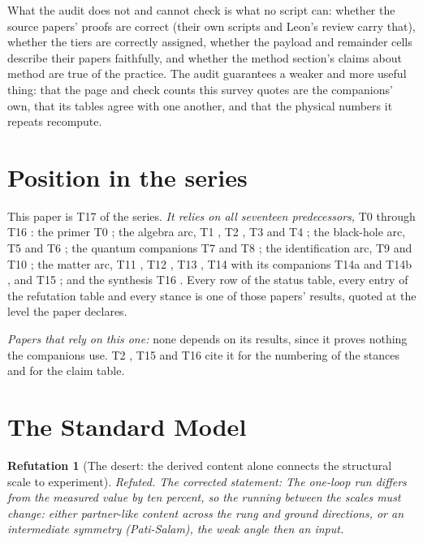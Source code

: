 \documentclass[11pt]{article}
\newtheorem{refutation}[theorem]{Refutation}
\theoremstyle{definition}
\theoremstyle{plain}
\begin{document}
What the audit does not and cannot check is what no script can: whether the source papers' proofs are correct (their own scripts and Leon's review carry that), whether the tiers are correctly assigned, whether the payload and remainder cells describe their papers faithfully, and whether the method section's claims about method are true of the practice. The audit guarantees a weaker and more useful thing: that the page and check counts this survey quotes are the companions' own, that its tables agree with one another, and that the physical numbers it repeats recompute.

\section{Position in the series}

\label{c:note.programme.setting-position-series}
This paper is T17 of the series. \emph{It relies on all seventeen predecessors,} T0 \cite{ButlerT0} through T16 \cite{ButlerT16}: the primer T0 \cite{ButlerT0}; the algebra arc, T1 \cite{ButlerT1}, T2 \cite{ButlerT2}, T3 \cite{ButlerT3} and T4 \cite{ButlerT4}; the black-hole arc, T5 \cite{ButlerT5} and T6 \cite{ButlerT6}; the quantum companions T7 \cite{ButlerT7} and T8 \cite{ButlerT8}; the identification arc, T9 \cite{ButlerT9} and T10 \cite{ButlerT10}; the matter arc, T11 \cite{ButlerT11}, T12 \cite{ButlerT12}, T13 \cite{ButlerT13}, T14 \cite{ButlerT14} with its companions T14a \cite{ButlerT14a} and T14b \cite{ButlerT14b}, and T15 \cite{ButlerT15}; and the synthesis T16 \cite{ButlerT16}. Every row of the status table, every entry of the refutation table and every stance is one of those papers' results, quoted at the level the paper declares.

\emph{Papers that rely on this one:} none depends on its results, since it proves nothing the companions use. T2 \cite{ButlerT2}, T15 \cite{ButlerT15} and T16 \cite{ButlerT16} cite it for the numbering of the stances and for the claim table.

\section{The Standard Model}

\begin{refutation}[The desert: the derived content alone connects the structural scale to experiment]\label{c:refuted.the-desert-the-derived-content-alone-connects-th}
Refuted. The corrected statement: The one-loop run differs from the measured value by ten percent, so the running between the scales must change: either partner-like content across the rung and ground directions, or an intermediate symmetry (Pati-Salam), the weak angle then an input.
\end{refutation}
\end{document}
